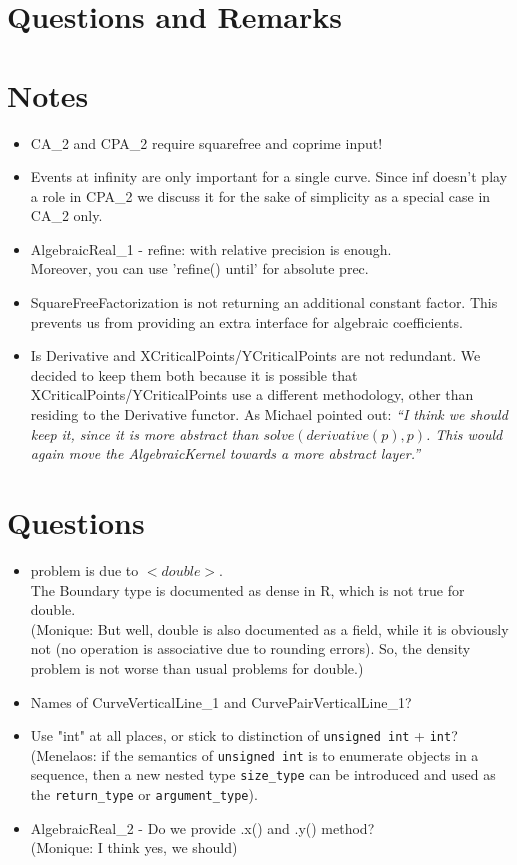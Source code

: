 
\section{Questions and Remarks}

\section{Notes}
\begin{itemize}
 \item CA\_2 and CPA\_2 require squarefree and coprime input! 
 \item Events at infinity are only important for a single curve. Since
   inf doesn't play a role in CPA\_2 we discuss it for the sake of
   simplicity as a special case in CA\_2 only. 
\item AlgebraicReal\_1 - refine: with relative precision is enough. \\
      Moreover, you can use 'refine() until' for absolute prec.
\item SquareFreeFactorization is not returning an additional constant 
      factor. This prevents us from providing an extra interface for 
      algebraic coefficients.
 \item Is Derivative and XCriticalPoints/YCriticalPoints are not
   redundant. We decided to keep them both because it is possible that
   XCriticalPoints/YCriticalPoints use a different methodology, other
   than residing to the Derivative functor. As Michael pointed out:
   \emph{``I think we should keep it, since it is more abstract than
     $solve(derivative(p),p)$.  This would again move the {\em
       AlgebraicKernel} towards a more abstract layer.''}
\end{itemize}

\section{Questions}
\begin{itemize}
\item problem is due to $<double>$.\\
    The Boundary type is documented as dense in R, which is not true
    for double.\\ (Monique: But well, double is also documented as a
    field, while it is obviously not (no operation is associative
    due to rounding errors). So, the density problem is not worse
    than usual problems for double.)
\item Names of CurveVerticalLine\_1 and CurvePairVerticalLine\_1?
\item Use "int" at all places, or stick to distinction of \texttt{unsigned
   int} + \texttt{int}?
   (Menelaos: if the semantics of \texttt{unsigned int} is to enumerate
   objects in a sequence, then a new nested type \texttt{size\_type}
   can be introduced and used as the \texttt{return\_type} or
   \texttt{argument\_type}).
\item AlgebraicReal\_2 - Do we provide .x() and .y() method?\\
     (Monique: I think yes, we should)
\end{itemize}

